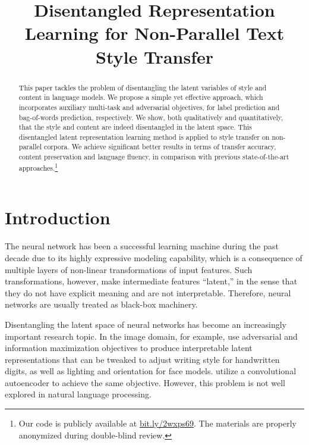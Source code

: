 \documentclass[letterpaper]{article} %
\title{Disentangled Representation Learning for Non-Parallel Text Style Transfer}
\date{}
\newcommand{\citeay}[1]{\citeauthor{#1} \shortcite{#1}}
\begin{document}
\maketitle
\graphicspath{{images/}}

\begin{abstract}
	This paper tackles the problem of disentangling the latent variables of style and content in language models. We propose a simple yet effective approach, which incorporates auxiliary multi-task and adversarial objectives, for label prediction and bag-of-words prediction, respectively.
	We show, both qualitatively and quantitatively, that the style and content are indeed disentangled in the latent space.
	This disentangled latent representation learning method is applied to style transfer on non-parallel corpora.
	We achieve significant better results in terms of transfer accuracy, content preservation and language fluency, in comparison with previous state-of-the-art approaches.\footnote{Our code is publicly available at \url{bit.ly/2wxps69}. The materials are properly anonymized during double-blind review.}
\end{abstract}

% 


\section{Introduction}

The neural network has been a successful learning machine during the past decade due to its highly expressive modeling capability, which is a consequence of multiple layers of non-linear transformations of input features.
Such transformations, however, make intermediate features ``latent,'' in the sense that they do not have explicit meaning and are not interpretable.
Therefore, neural networks are usually treated as black-box machinery.

Disentangling the latent space of neural networks has become an increasingly important research topic.
In the image domain, for example, \citeay{chen2016infogan} use adversarial and information maximization objectives to produce interpretable latent representations that can be tweaked to adjust writing style for handwritten digits, as well as lighting and orientation for face models.
\citeay{mathieu2016disentangling} utilize a convolutional autoencoder to achieve the same objective.
However, this problem is not well explored in natural language processing.
\end{document}
